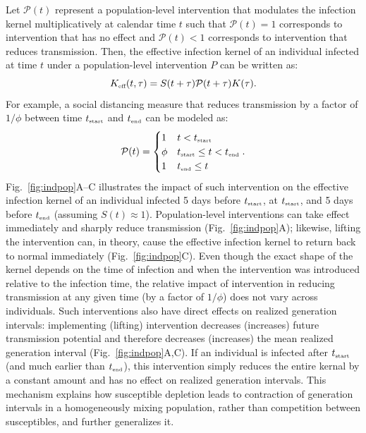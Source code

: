 \documentclass[12pt]{article}
\newcommand{\fref}[1]{Fig.~\ref{fig:#1}}
\newcommand{\tsub}[2]{#1_{{\textrm{\tiny #2}}}}
\newcommand{\tstart}{\ensuremath{\tsub{t}{start}}\xspace}
\newcommand{\tend}{\ensuremath{\tsub{t}{end}}\xspace}
\newcommand{\Keff}{\ensuremath{\tsub{K}{eff}}\xspace}
\newcommand{\PP}{{\mathcal P}}
\begin{document}
Let $\PP(t)$ represent a population-level intervention that modulates the infection kernel multiplicatively at calendar time $t$ such that $\PP(t)=1$ corresponds to intervention that has no effect and $\PP(t) < 1$ corresponds to intervention that reduces transmission.
Then, the effective infection kernel of an individual infected at time $t$ under a population-level intervention $P$ can be written as:
\begin{equation}
\Keff(t, \tau) = S(t+\tau) \PP(t + \tau) K(\tau).
\end{equation}
For example, a social distancing measure that reduces transmission by a factor of $1/\phi$ between time \tstart and \tend can be modeled as:
\begin{equation}
\PP(t) = \begin{cases}
1 & t < \tstart\\
\phi & \tstart \leq t < \tend\\
1 & \tend \leq t
\end{cases}.
\end{equation}
\fref{indpop}A--C illustrates the impact of such intervention on the effective infection kernel of an individual infected 5 days before $\tstart$, at $\tstart$, and 5 days before $\tend$ (assuming $S(t) \approx 1$).
Population-level interventions can take effect immediately and sharply reduce transmission (\fref{indpop}A);
likewise, lifting the intervention can, in theory, cause the effective infection kernel to return back to normal immediately (\fref{indpop}C).
Even though the exact shape of the kernel depends on the time of infection and when the intervention was introduced relative to the infection time, the relative impact of intervention in reducing transmission at any given time (by a factor of $1/\phi$) does not vary across individuals.
Such interventions also have direct effects on realized generation intervals:
implementing (lifting) intervention decreases (increases) future transmission potential and therefore decreases (increases) the mean realized generation interval (\fref{indpop}A,C).
If an individual is infected after \tstart (and much earlier than \tend), this intervention simply reduces the entire kernal by a constant amount and has no effect on realized generation intervals.
This mechanism explains how susceptible depletion leads to contraction of generation intervals in a homogeneously mixing population, rather than competition between susceptibles, and further generalizes it.
\end{document}
